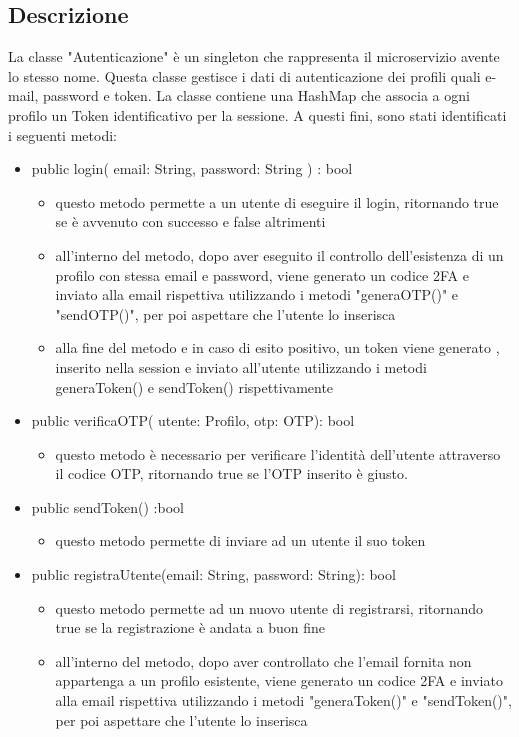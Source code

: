 \documentclass{report}
\begin{document}
\subsection*{Descrizione}
La classe "Autenticazione" è un singleton che rappresenta il microservizio avente lo stesso nome. 
Questa classe gestisce i dati di autenticazione dei profili quali e-mail, password e token. 
La classe contiene una HashMap che associa a ogni profilo un Token identificativo per la sessione.
A questi fini, sono stati identificati i seguenti metodi:
\begin{itemize}
	\item public login( email: String, password: String ) : bool
		\begin{itemize}
			\item questo metodo permette a un utente di eseguire il login, ritornando true se è avvenuto con successo e false altrimenti
			\item all'interno del metodo, dopo aver eseguito il controllo dell'esistenza di un profilo con stessa email e password,
			viene generato un codice 2FA e inviato alla email rispettiva utilizzando i metodi "generaOTP()" e "sendOTP()", per poi aspettare che l'utente lo inserisca
			\item alla fine del metodo e in caso di esito positivo, un token viene generato , inserito nella session e inviato all'utente utilizzando i metodi generaToken() e sendToken() rispettivamente
		\end{itemize}
	\item public verificaOTP( utente: Profilo, otp: OTP): bool
		\begin{itemize}
			\item questo metodo è necessario per verificare l'identità dell'utente attraverso il codice OTP, ritornando true se l'OTP inserito è giusto.
		\end{itemize}
	\item public sendToken() :bool 
		\begin{itemize}
			\item questo metodo permette di inviare ad un utente il suo token
		\end{itemize}
	\item public registraUtente(email: String, password: String): bool
		\begin{itemize}
			\item questo metodo permette ad un nuovo utente di registrarsi, ritornando true se la registrazione è andata a buon fine
			\item all'interno del metodo, dopo aver controllato che l'email fornita non appartenga a un profilo esistente, viene generato un codice 2FA e inviato alla email rispettiva utilizzando i metodi "generaToken()" e "sendToken()", per poi aspettare che l'utente lo inserisca

\end{itemize}
\end{itemize}
\end{document}
